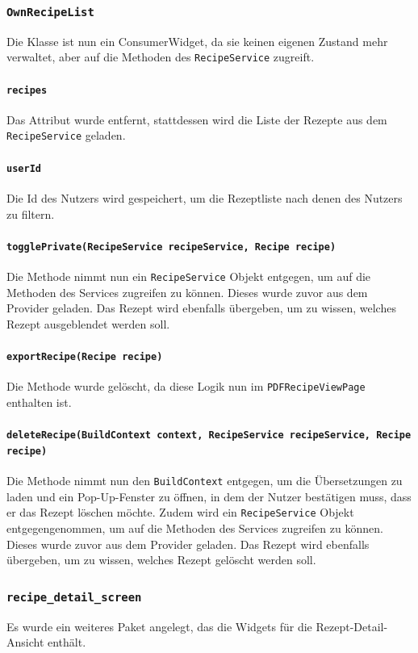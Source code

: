 \documentclass{implementierungsheft}
\begin{document}
\subsubsection*{\texttt{OwnRecipeList}}
Die Klasse ist nun ein ConsumerWidget, da sie keinen eigenen Zustand mehr verwaltet, aber auf die Methoden des \texttt{RecipeService} zugreift.
\paragraph{\texttt{recipes}}
Das Attribut wurde entfernt, stattdessen wird die Liste der Rezepte aus dem \texttt{RecipeSer\-vice} geladen.
\paragraph{\texttt{userId}}
Die Id des Nutzers wird gespeichert, um die Rezeptliste nach denen des Nutzers zu filtern.
\paragraph{\texttt{togglePrivate(RecipeService recipeService, Recipe recipe)}}
Die Methode nimmt nun ein \texttt{RecipeService} Objekt entgegen, um auf die Methoden des Services zugreifen zu können. Dieses wurde zuvor aus dem Provider geladen. Das Rezept wird ebenfalls übergeben, um zu wissen, welches Rezept ausgeblendet werden soll.
\paragraph{\texttt{exportRecipe(Recipe recipe)}}
Die Methode wurde gelöscht, da diese Logik nun im \texttt{PDFRecipe\-ViewPage} enthalten ist.
\paragraph{\texttt{deleteRecipe(BuildContext context, RecipeService recipeService, Recipe recipe)}\\}
Die Methode nimmt nun den \texttt{BuildContext} entgegen, um die Übersetzungen zu laden und ein Pop-Up-Fenster zu öffnen, in dem der Nutzer bestätigen muss, dass er das Rezept löschen möchte. Zudem wird ein \texttt{RecipeService} Objekt entgegengenommen, um auf die Methoden des Services zugreifen zu können. Dieses wurde zuvor aus dem Provider geladen. Das Rezept wird ebenfalls übergeben, um zu wissen, welches Rezept gelöscht werden soll.
\subsubsection{\texttt{recipe\_detail\_screen}}
Es wurde ein weiteres Paket angelegt, das die Widgets für die Rezept-Detail-Ansicht enthält.
\end{document}
